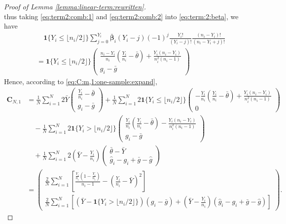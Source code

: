 \documentclass[12pt,letterpaper]{article}
\begin{document}
\begin{proof}[Proof of Lemma \ref{lemma:linear-term:rewritten}]
\begin{equation}
\end{equation}
thus taking \eqref{eq:term2:comb:1} and \eqref{eq:term2:comb:2} into \eqref{eq:term:2:beta}, we have 
\begin{equation}\label{eq:term:2:beta:2}
\begin{array}{rl}
&\quad\displaystyle\mathbf{1}\{Y_i\leq\lfloor n_i/2\rfloor\}\sum_{j=0}^{Y_i}\boldsymbol{\bar{\beta}}_i(Y_i-j)(-1)^j\frac{Y_i!}{(Y_i-j)!}\frac{(n_i-Y_i)!}{(n_i-Y_i+j)!}\\
&\displaystyle=\mathbf{1}\{Y_i\leq\lfloor n_i/2\rfloor\}\begin{pmatrix}
\displaystyle\frac{n_i-Y_i}{n_i}\left(\frac{Y_i}{n_i}-\bar{\theta}\right)+\frac{Y_i(n_i-Y_i)}{n_i^2(n_i-1)}\\
g_i-\bar{g}
\end{pmatrix}
\end{array}
\end{equation}
Hence, according to \eqref{eq:C:m,1:one-sample:expand}, 
\begin{equation}\label{eq:C:m,1:one-sample:new}
\begin{array}{rl}
\mathbf{C}_{N,1}\!\!\!\!&\displaystyle=\frac{1}{N}\sum_{i=1}^N2\bar{Y}\begin{pmatrix}
\displaystyle\frac{Y_i}{n_i}-\bar{\theta}\\
g_i-\bar{g}
\end{pmatrix}+\frac{1}{N}\sum_{i=1}^N2\mathbf{1}\{Y_i\leq\lfloor n_i/2\rfloor\}\begin{pmatrix}
\displaystyle-\frac{Y_i}{n_i}\left(\frac{Y_i}{n_i}-\bar{\theta}\right)+\frac{Y_i(n_i-Y_i)}{n_i^2(n_i-1)}\\
0
\end{pmatrix}\\
&\displaystyle\quad-\frac{1}{N}\sum_{i=1}^N2\mathbf{1}\{Y_i>\lfloor n_i/2\rfloor\}\begin{pmatrix}
\displaystyle\frac{Y_i}{n_i}\left(\frac{Y_i}{n_i}-\bar{\theta}\right)-\frac{Y_i(n_i-Y_i)}{n_i^2(n_i-1)}\\
g_i-\bar{g}
\end{pmatrix}\\
&\displaystyle\quad+\frac{1}{N}\sum_{i=1}^N2\left(\bar{Y}-\frac{Y_i}{n_i}\right)\begin{pmatrix}
    \bar{\theta}-\bar{Y}\\
    \hat{g}_i-g_i+\bar{g}-\hat{g}
\end{pmatrix}\\
&\displaystyle=\begin{pmatrix}
    \displaystyle\frac{2}{N}\sum_{i=1}^N\left[\frac{\tfrac{Y_i}{n_i}\left(1-\tfrac{Y_i}{n_i}\right)}{n_i-1}-\left(\tfrac{Y_i}{n_i}-\bar{Y}\right)^2\right]\\
    \displaystyle\frac{2}{N}\sum_{i=1}^N\left[(\bar{Y}-\mathbf{1}\{Y_i>\lfloor n_i/2\rfloor\})(g_i-\bar{g})+\left(\bar{Y}-\tfrac{Y_i}{n_i}\right)(\hat{g}_i-g_i+\bar{g}-\hat{g})\right]
\end{pmatrix}.
\end{array}
\end{equation}
\end{proof}
\end{document}
